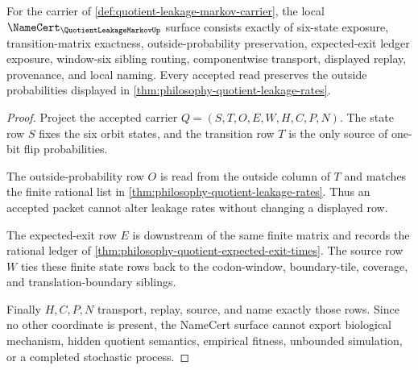 \begin{theorem}
\label{thm:quotient-leakage-markov-namecert-obligations}
For the carrier of \autoref{def:quotient-leakage-markov-carrier}, the local $\NameCert_{\QuotientLeakageMarkovUp}$ surface consists exactly of six-state exposure, transition-matrix exactness, outside-probability preservation, expected-exit ledger exposure, window-six sibling routing, componentwise transport, displayed replay, provenance, and local naming. Every accepted read preserves the outside probabilities displayed in \autoref{thm:philosophy-quotient-leakage-rates}.
\end{theorem}
\begin{proof}
Project the accepted carrier $Q=(S,T,O,E,W,H,C,P,N)$. The state row $S$ fixes the six orbit states, and the transition row $T$ is the only source of one-bit flip probabilities.

The outside-probability row $O$ is read from the outside column of $T$ and matches the finite rational list in \autoref{thm:philosophy-quotient-leakage-rates}. Thus an accepted packet cannot alter leakage rates without changing a displayed row.

The expected-exit row $E$ is downstream of the same finite matrix and records the rational ledger of \autoref{thm:philosophy-quotient-expected-exit-times}. The source row $W$ ties these finite state rows back to the codon-window, boundary-tile, coverage, and translation-boundary siblings.

Finally $H,C,P,N$ transport, replay, source, and name exactly those rows. Since no other coordinate is present, the NameCert surface cannot export biological mechanism, hidden quotient semantics, empirical fitness, unbounded simulation, or a completed stochastic process.
\end{proof}

